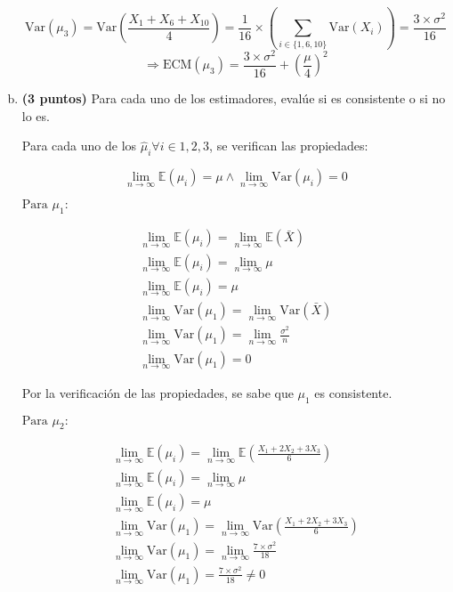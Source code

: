 \documentclass[../main.tex]{subfiles}
\begin{document}
\begin{enumerate}[(a)]
$$ \text{Var}(\mu_{3}) =  \text{Var}(\frac{X_1 + X_6 + X_{10}}{4}) = \frac{1}{16} \times  \left(\sum_{i \in \{ 1, 6, 10\}} \text{Var}(X_{i}) \right) = \frac{3\times \sigma ^2}{16}$$
$$\Rightarrow \text{ECM}(\mu_{3}) = \frac{3\times \sigma ^2}{16} + \left(\frac{\mu} {4}\right) ^2$$

\item \textbf{(3 puntos)} Para cada uno de los estimadores, evalúe si es consistente o si no lo es.

Para cada uno de los $\hat{\mu}_i \forall i \in {1,2,3}$, se verifican las propiedades:

$$\lim_{n\to\infty} \mathbb{E}(\mu_i) = \mu \wedge \lim_{n\to\infty} \text{Var}(\mu_i) = 0$$

$\text{Para } \mu_1:$

\begin{equation}
\begin{split}
\lim_{n\to\infty} \mathbb{E}(\mu_i) = \lim_{n\to\infty} \mathbb{E}(\bar{X}) \\
\lim_{n\to\infty} \mathbb{E}(\mu_i) = \lim_{n\to\infty} \mu \\
\lim_{n\to\infty} \mathbb{E}(\mu_i) = \mu \\
\lim_{n\to\infty} \text{Var}(\mu_1) = \lim_{n\to\infty} \text{Var}(\bar{X}) \\
\lim_{n\to\infty} \text{Var}(\mu_1) = \lim_{n\to\infty} \frac{\sigma ^2}{n} \\
\lim_{n\to\infty} \text{Var}(\mu_1) = 0
\end{split}
\end{equation}

Por la verificación de las propiedades, se sabe que $\mu_1$ es consistente.

$\text{Para } \mu_2:$

\begin{equation}
\begin{split}
\lim_{n\to\infty} \mathbb{E}(\mu_i) = \lim_{n\to\infty} \mathbb{E}\left( \frac{X_1 + 2X_2 + 3X_3}{6}\right) \\
\lim_{n\to\infty} \mathbb{E}(\mu_i) = \lim_{n\to\infty} \mu \\
\lim_{n\to\infty} \mathbb{E}(\mu_i) = \mu \\
\lim_{n\to\infty} \text{Var}(\mu_1) = \lim_{n\to\infty} \text{Var}\left( \frac{X_1 + 2X_2 + 3X_3}{6}\right) \\
\lim_{n\to\infty} \text{Var}(\mu_1) = \lim_{n\to\infty}\frac{7 \times \sigma ^2}{18} \\
\lim_{n\to\infty} \text{Var}(\mu_1) = \frac{7 \times \sigma ^2}{18} \neq 0
\end{split}
\end{equation}


\end{enumerate}
\end{document}
